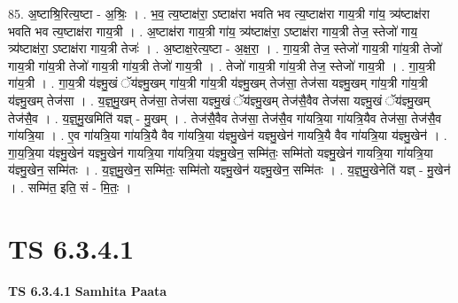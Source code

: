 \documentclass[17pt]{extarticle}
\begin{document}
85. अ॒ष्टाश्रि॒रित्य॒ष्टा - अ॒श्रिः॒ । . भ॒व॒ त्य॒ष्टाक्ष॑रा॒ ऽष्टाक्ष॑रा भवति भव त्य॒ष्टाक्ष॑रा गाय॒त्री गा॑य॒ त्र्य॑ष्टाक्ष॑रा भवति भव त्य॒ष्टाक्ष॑रा गाय॒त्री । . अ॒ष्टाक्ष॑रा गाय॒त्री गा॑य॒ त्र्य॑ष्टाक्ष॑रा॒ ऽष्टाक्ष॑रा गाय॒त्री तेज॒ स्तेजो॑ गाय॒ त्र्य॑ष्टाक्ष॑रा॒ ऽष्टाक्ष॑रा गाय॒त्री तेजः॑ । . अ॒ष्टाक्ष॒रेत्य॒ष्टा - अ॒क्ष॒रा॒ । . गा॒य॒त्री तेज॒ स्तेजो॑ गाय॒त्री गा॑य॒त्री तेजो॑ गाय॒त्री गा॑य॒त्री तेजो॑ गाय॒त्री गा॑य॒त्री तेजो॑ गाय॒त्री । . तेजो॑ गाय॒त्री गा॑य॒त्री तेज॒ स्तेजो॑ गाय॒त्री । . गा॒य॒त्री गा॑य॒त्री । . गा॒य॒त्री य॑ज्ञ्मु॒खं ॅय॑ज्ञ्मु॒खम् गा॑य॒त्री गा॑य॒त्री य॑ज्ञ्मु॒खम् तेज॑सा॒ तेज॑सा यज्ञ्मु॒खम् गा॑य॒त्री गा॑य॒त्री य॑ज्ञ्मु॒खम् तेज॑सा । . य॒ज्ञ्॒मु॒खम् तेज॑सा॒ तेज॑सा यज्ञ्मु॒खं ॅय॑ज्ञ्मु॒खम् तेज॑सै॒वैव तेज॑सा यज्ञ्मु॒खं ॅय॑ज्ञ्मु॒खम् तेज॑सै॒व । . य॒ज्ञ्॒मु॒खमिति॑ यज्ञ् - मु॒खम् । . तेज॑सै॒वैव तेज॑सा॒ तेज॑सै॒व गा॑यत्रि॒या गा॑यत्रि॒यैव तेज॑सा॒ तेज॑सै॒व गा॑यत्रि॒या । . ए॒व गा॑यत्रि॒या गा॑यत्रि॒यै वैव गा॑यत्रि॒या य॑ज्ञ्मु॒खेन॑ यज्ञ्मु॒खेन॑ गायत्रि॒यै वैव गा॑यत्रि॒या य॑ज्ञ्मु॒खेन॑ । . गा॒य॒त्रि॒या य॑ज्ञ्मु॒खेन॑ यज्ञ्मु॒खेन॑ गायत्रि॒या गा॑यत्रि॒या य॑ज्ञ्मु॒खेन॒ सम्मि॑तः॒ सम्मि॑तो यज्ञ्मु॒खेन॑ गायत्रि॒या गा॑यत्रि॒या य॑ज्ञ्मु॒खेन॒ सम्मि॑तः । . य॒ज्ञ्॒मु॒खेन॒ सम्मि॑तः॒ सम्मि॑तो यज्ञ्मु॒खेन॑ यज्ञ्मु॒खेन॒ सम्मि॑तः । . य॒ज्ञ्॒मु॒खेनेति॑ यज्ञ् - मु॒खेन॑ । . सम्मि॑त॒ इति॒ सं - मि॒तः॒ । \newline
\pagebreak
{}

\section{ TS 6.3.4.1 }

\textbf{TS 6.3.4.1 } \newline
\textbf{Samhita Paata} \newline
\end{document}

